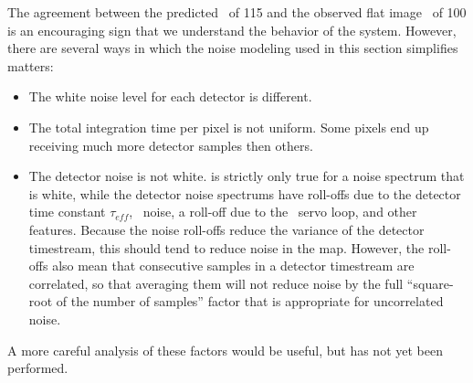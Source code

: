 The agreement between the predicted \NETD\ of \SI{115}{\mK} and the observed flat image \NETD\ of \SI{100}{\mK} is an encouraging sign that we understand the behavior of the system.
However, there are several ways in which the noise modeling used in this section simplifies matters:
\begin{itemize}
\item The white noise level for each detector is different.
\item The total integration time per pixel is not uniform. Some pixels end up receiving much more detector samples then others.%
\item The detector noise is not white.
       is strictly only true for a noise spectrum that is white, while the detector noise spectrums have roll-offs due to the detector time constant $\tau_{eff}$, \SQUID\ noise, a roll-off due to the \SQUID\ servo loop, and other features.
      Because the noise roll-offs reduce the variance of the detector timestream, this should tend to reduce noise in the map.
      However, the roll-offs also mean that consecutive samples in a detector timestream are correlated, so that averaging them will not reduce noise by the full ``square-root of the number of samples'' factor that is appropriate for uncorrelated noise.
\end{itemize}
A more careful analysis of these factors would be useful, but has not yet been performed.



